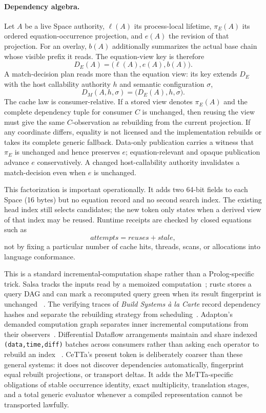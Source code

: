 \documentclass[11pt]{article}
\newcommand{\code}[1]{\texttt{#1}}
\newcommand{\CeTTa}{\textup{CeTTa}}
\begin{document}
\paragraph{Dependency algebra.}
Let $A$ be a live Space authority, $\ell(A)$ its process-local lifetime,
$\pi_E(A)$ its ordered equation-occurrence projection, and $e(A)$ the
revision of that projection.  For an overlay, $b(A)$ additionally summarizes
the actual base chain whose visible prefix it reads.  The equation-view key is
therefore
\[
  D_E(A) = \bigl(\ell(A),e(A),b(A)\bigr).
\]
A match-decision plan reads more than the equation view: its key extends
$D_E$ with the host callability authority $h$ and semantic configuration
$\sigma$,
\[
  D_M(A,h,\sigma)=\bigl(D_E(A),h,\sigma\bigr).
\]
The cache law is consumer-relative.  If a stored view denotes
$\pi_E(A)$ and the complete dependency tuple for consumer $C$ is unchanged,
then reusing the view must give the same $C$-observation as rebuilding from
the current projection.  If any coordinate differs, equality is not licensed
and the implementation rebuilds or takes its complete generic fallback.
Data-only publication carries a witness that $\pi_E$ is unchanged and hence
preserves $e$; equation-relevant and opaque publication advance $e$
conservatively.  A changed host-callability authority invalidates a
match-decision even when $e$ is unchanged.

This factorization is important operationally.  It adds two 64-bit fields to
each Space (16 bytes) but no equation record and no second search index.  The
existing head index still selects candidates; the new token only states when
a derived view of that index may be reused.  Runtime receipts are checked by
closed equations such as
\[
  \mathit{attempts}=\mathit{reuses}+\mathit{stale},
\]
not by fixing a particular number of cache hits, threads, scans, or
allocations into language conformance.

This is a standard incremental-computation shape rather than a
Prolog-specific trick.  Salsa tracks the inputs read by a memoized
computation~\cite{salsa-red-green}; rustc stores a query DAG and can mark a
recomputed query green when its result fingerprint is unchanged
~\cite{rustc-red-green}.  The verifying traces of
\emph{Build Systems \`a la Carte} record dependency hashes and separate the
rebuilding strategy from scheduling~\cite{build-systems-carte}.  Adapton's
demanded computation graph separates inner incremental computations from
their observers~\cite{adapton}.  Differential Dataflow arrangements maintain
and share indexed \code{(data,time,diff)} batches across consumers rather than
asking each operator to rebuild an index
~\cite{differential-arrangements}.  \CeTTa{}'s present token is deliberately
coarser than these general systems: it does not discover dependencies
automatically, fingerprint equal rebuilt projections, or transport deltas.
It adds the MeTTa-specific obligations of stable occurrence identity, exact
multiplicity, translation stages, and a total generic evaluator whenever a
compiled representation cannot be transported lawfully.
\end{document}
